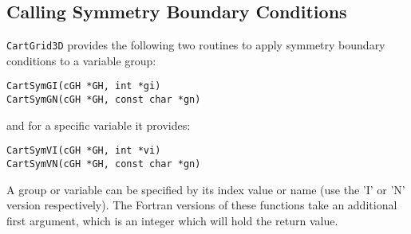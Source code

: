 \documentclass{article}
\begin{document}

\subsection{Calling Symmetry Boundary Conditions}

\verb|CartGrid3D| provides the following two routines to apply symmetry
boundary conditions to a variable group:

\begin{verbatim}
CartSymGI(cGH *GH, int *gi)
CartSymGN(cGH *GH, const char *gn)
\end{verbatim}

and for a specific variable it provides:

\begin{verbatim}
CartSymVI(cGH *GH, int *vi)
CartSymVN(cGH *GH, const char *gn)
\end{verbatim}

A group or variable can
be specified by its index value or name (use the 'I' or 'N' version
respectively).  The Fortran versions of these functions take an
additional first argument, which is an integer which will hold the
return value.


\end{document}
